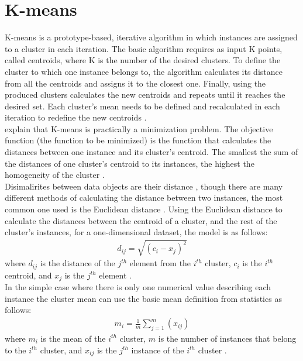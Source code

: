 \section{K-means}
K-means is a prototype-based, iterative algorithm in which instances are assigned to a cluster in each iteration. The basic algorithm requires as input K points, called centroids, where K is the number of the desired clusters. To define the cluster to which one instance belongs to, the algorithm calculates its distance from all the centroids and assigns it to the closest one. Finally, using the produced clusters calculates the new centroids and repeats until it reaches the desired set. Each cluster's mean needs to be defined and recalculated in each iteration to redefine the new centroids \autocite{dunham, tanSteinKum}. \\
\textcite{euclidean} explain that K-means is practically a minimization problem. The objective function (the function to be minimized) is the function that calculates the distances between one instance and its cluster's centroid. The smallest the sum of the distances of one cluster's centroid to its instances, the highest the homogeneity of the cluster \autocite[2]{euclidean}. \\
Disimalirites between data objects are their distance \autocite[69]{tanSteinKum}, though there are many different methods of calculating the distance between two instances, the most common one used is the Euclidean distance \autocite[648]{survey}. Using the Euclidean distance to calculate the distances between the centroid of a cluster, and the rest of the cluster's instances, for a one-dimensional dataset, the model is as follows:
\begin{eqnarray*}
d_{ij} = \sqrt{(c_{i}-x_{j})^2}
\end{eqnarray*}
where \(d_{ij}\) is the distance of the \(j^{th}\) element from the \(i^{th}\) cluster, \(c_{i}\) is the \(i^{th}\) centroid, and \(x_{j}\) is the \(j^{th}\) element \autocite[69]{tanSteinKum}. \\
In the simple case where there is only one numerical value describing each instance the cluster mean can use the basic mean definition from statistics as follows: \\
\begin{eqnarray*}
m_{i} = \frac{1}{m}\sum_{j=1}^{m}(x_{ij})
\end{eqnarray*}
where \(m_{i}\) is the mean of the \(i^{th}\) cluster, \(m\) is the number of instances that belong to the \(i^{th}\) cluster, and \(x_{ij}\) is the \(j^{th}\) instance of the \(i^{th}\) cluster \autocite[140]{dunham}. \\
